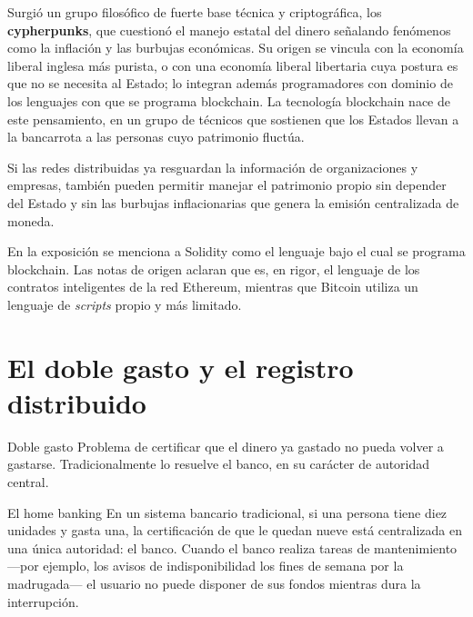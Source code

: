 \documentclass[12pt,oneside]{book}
\begin{document}
Surgió un grupo filosófico de fuerte base técnica y criptográfica, los \textbf{cypherpunks}, que cuestionó el manejo estatal del dinero señalando fenómenos como la inflación y las burbujas económicas. Su origen se vincula con la economía liberal inglesa más purista, o con una economía liberal libertaria cuya postura es que no se necesita al Estado; lo integran además programadores con dominio de los lenguajes con que se programa blockchain. La tecnología blockchain nace de este pensamiento, en un grupo de técnicos que sostienen que los Estados llevan a la bancarrota a las personas cuyo patrimonio fluctúa.

\begin{important}
Si las redes distribuidas ya resguardan la información de organizaciones y empresas, también pueden permitir manejar el patrimonio propio sin depender del Estado y sin las burbujas inflacionarias que genera la emisión centralizada de moneda.
\end{important}

\begin{note}
En la exposición se menciona a Solidity como el lenguaje bajo el cual se programa blockchain. Las notas de origen aclaran que es, en rigor, el lenguaje de los contratos inteligentes de la red Ethereum, mientras que Bitcoin utiliza un lenguaje de \emph{scripts} propio y más limitado.
\end{note}

\section{El doble gasto y el registro distribuido}

\begin{definition}{Doble gasto}
Problema de certificar que el dinero ya gastado no pueda volver a gastarse. Tradicionalmente lo resuelve el banco, en su carácter de autoridad central.
\end{definition}

\begin{example}{El home banking}
En un sistema bancario tradicional, si una persona tiene diez unidades y gasta una, la certificación de que le quedan nueve está centralizada en una única autoridad: el banco. Cuando el banco realiza tareas de mantenimiento ---por ejemplo, los avisos de indisponibilidad los fines de semana por la madrugada--- el usuario no puede disponer de sus fondos mientras dura la interrupción.
\end{example}
\end{document}
